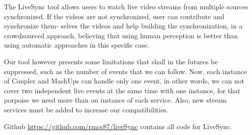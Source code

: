 The LiveSync tool allows users to watch live video streams from multiple sources synchronized. If the videos are not synchronized, user can contribute and synchronize them- selves the videos and help building the synchronization, in a crowdsourced approach, believing that using human perception is better than using automatic approaches in this specific case.

Our tool however presents some limitations that shall in the futures be suppressed, such as the number of events that we can follow. Now, each instance of Coupler and MashUps can handle only one event, in other words, we can not cover two independent live events at the same time with one instance, for that porpoise we need more than on instance of each service. Also, new stream services must be added to increase our compatibilities.

Github \url{https://github.com/rmcs87/liveSync} contains all code for LiveSync.





